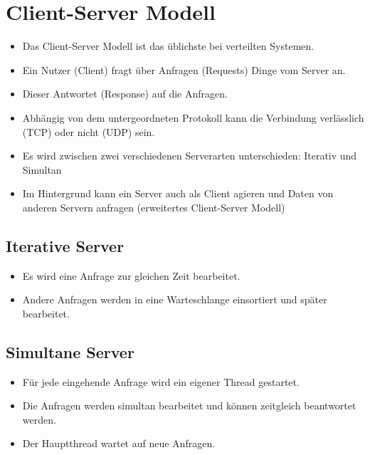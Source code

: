 \documentclass[a4paper, 11pt, accentcolor = tud3b]{tudreport}
\begin{document}
        \section{Client-Server Modell} %
            \begin{itemize}
            	\item Das Client-Server Modell ist das üblichste bei verteilten Systemen.
            	\item Ein Nutzer (Client) fragt über Anfragen (Requests) Dinge vom Server an.
            	\item Dieser Antwortet (Response) auf die Anfragen.
            	\item Abhängig von dem untergeordneten Protokoll kann die Verbindung verlässlich (TCP) oder nicht (UDP) sein.
            	\item Es wird zwischen zwei verschiedenen Serverarten unterschieden: Iterativ und Simultan
            	\item Im Hintergrund kann ein Server auch als Client agieren und Daten von anderen Servern anfragen (erweitertes Client-Server Modell)
            \end{itemize}

            \subsection{Iterative Server}
                \begin{itemize}
                	\item Es wird eine Anfrage zur gleichen Zeit bearbeitet.
                	\item Andere Anfragen werden in eine Warteschlange einsortiert und später bearbeitet.
                \end{itemize}

            \subsection{Simultane Server}
                \begin{itemize}
                	\item Für jede eingehende Anfrage wird ein eigener Thread gestartet.
                	\item Die Anfragen werden simultan bearbeitet und können zeitgleich beantwortet werden.
                	\item Der Hauptthread wartet auf neue Anfragen.
                \end{itemize}
\end{document}
